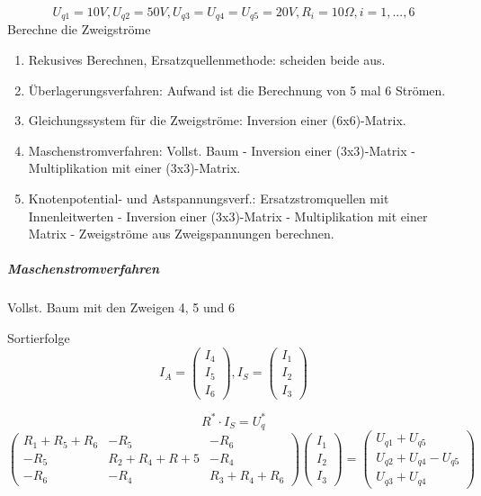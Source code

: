 \documentclass[german]{article}
\newcommand{\ohm}{\Omega}
\begin{document}


\[
	U_{q1} = 10V, U_{q2} = 50V, U_{q3} = U_{q4} = U_{q5} = 20V, R_i = 10 \ohm, i = 1, ..., 6
\]
Berechne die Zweigströme

\begin{enumerate}
	\item Rekusives Berechnen, Ersatzquellenmethode: scheiden beide aus.
	\item Überlagerungsverfahren: Aufwand ist die Berechnung von 5 mal 6 Strömen.
	\item Gleichungssystem für die Zweigströme: Inversion einer (6x6)-Matrix.
	\item Maschenstromverfahren: Vollst. Baum - Inversion einer (3x3)-Matrix - Multiplikation mit einer (3x3)-Matrix.
	\item Knotenpotential- und Astspannungsverf.: Ersatzstromquellen mit Innenleitwerten - Inversion einer (3x3)-Matrix - Multiplikation mit einer Matrix - Zweigströme aus Zweigspannungen berechnen.
\end{enumerate}

\subparagraph{Maschenstromverfahren}
Vollst. Baum mit den Zweigen 4, 5 und 6


Sortierfolge
\[
	I_A = \begin{pmatrix}I_4\\ I_5\\ I_6 \end{pmatrix},
	I_S = \begin{pmatrix}I_1\\ I_2\\ I_3 \end{pmatrix}
\]

\[
	R^* \cdot I_S = U_q^*
\]
\[
	\begin{pmatrix}
		R_1 + R_5 + R_6 & -R_5 & -R_6 \\
		-R_5 & R_2 + R_4 + R+5 & -R_4 \\
		-R_6 & -R_4 & R_3 + R_4 + R_6
	\end{pmatrix}
	\begin{pmatrix}
		I_1 \\
		I_2 \\
		I_3
	\end{pmatrix}
	=
	\begin{pmatrix}
		U_{q1} + U_{q5} \\
		U_{q2} + U_{q4} - U_{q5} \\
		U_{q3} + U_{q4}
	\end{pmatrix}
\]
\end{document}

